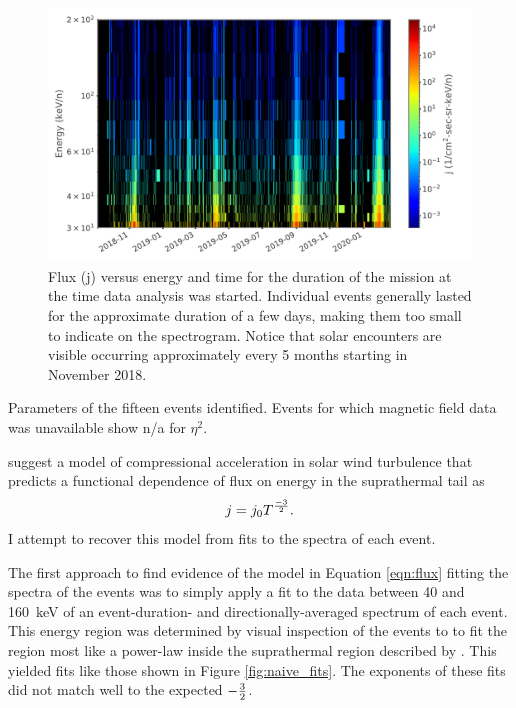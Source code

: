 \documentclass[letterpaper,11pt]{article}
\begin{document}
\begin{figure}[htbp]
\centering
\includegraphics[width=0.9\linewidth]{figures/flux_global.pdf}
\caption{Flux (j) versus energy and time for the duration of the mission at the time data analysis was started.  Individual events generally lasted for the approximate duration of a few days, making them too small to indicate on the spectrogram.  Notice that solar encounters are visible occurring approximately every 5 months starting in November 2018.}
\label{fig:flux_global}
\end{figure}

\begin{table}[htbp]

\caption{Parameters of the fifteen events identified.  Events for which magnetic field data was unavailable show n/a for $\eta^2$.}
\label{tab:params}
\end{table}

\citet{Fisk2006} suggest a model of compressional acceleration in solar wind turbulence that predicts a functional dependence of flux on energy in the suprathermal tail as
\begin{equation}
j = j_0 T^{-3 \over 2}.
\label{eqn:flux}
\end{equation}
I attempt to recover this model from fits to the spectra of each event.

The first approach to find evidence of the model in Equation \ref{eqn:flux} fitting the spectra of the events was to simply apply a fit to the data between 40 and \SI{160}{\kilo\electronvolt} of an event-duration- and directionally-averaged spectrum of each event.  This energy region was determined by visual inspection of the events to to fit the region most like a power-law inside the suprathermal region described by \citet{Fisk2008}. This yielded fits like those shown in Figure \ref{fig:naive_fits}.  The exponents of these fits did not match well to the expected $-{3 \over 2}$.
\end{document}
